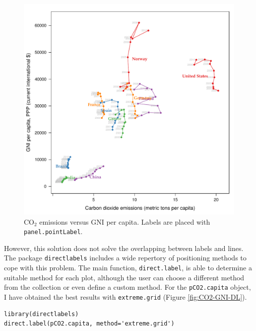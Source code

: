 \documentclass[smallroyalvopaper]{memoir}
\begin{document}
\begin{figure}[htb]
\centering
\includegraphics[width=.9\linewidth]{figs/CO2_capita.pdf}
\caption{\label{fig:CO2-GNI-glayer}$\mathrm{CO_2}$ emissions versus GNI per capita. Labels are placed with \texttt{panel.pointLabel}.}
\end{figure}


However, this solution does not solve the overlapping between labels
and lines. The package \texttt{directlabels} \cite{Hocking2013} includes a
wide repertory of positioning methods to cope with this problem. The
main function, \texttt{direct.label}, is able to determine a suitable method
for each plot, although the user can choose a different method from
the collection or even define a custom method. For the \texttt{pCO2.capita}
object, I have obtained the best results with \texttt{extreme.grid} (Figure
\ref{fig:CO2-GNI-DL}).


\lstset{language=R,numbers=none}
\begin{lstlisting}
library(directlabels)
direct.label(pCO2.capita, method='extreme.grid')
\end{lstlisting}
\end{document}
